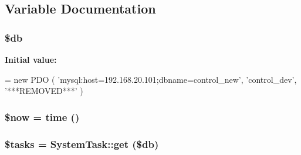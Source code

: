 \subsection{Variable Documentation}
\hypertarget{cron_8php_a1fa3127fc82f96b1436d871ef02be319}{}
\subsubsection[{\$db}]{\setlength{\rightskip}{0pt plus 5cm}\$db}\label{cron_8php_a1fa3127fc82f96b1436d871ef02be319}
{\bfseries Initial value\+:}
\begin{DoxyCode}
= \textcolor{keyword}{new} PDO
(
    \textcolor{stringliteral}{'mysql:host=192.168.20.101;dbname=control\_new'},
    \textcolor{stringliteral}{'control\_dev'},
    \textcolor{stringliteral}{'***REMOVED***'}
)
\end{DoxyCode}
\hypertarget{cron_8php_af1d5ccdee975b8f4d20aaffc5b28557c}{}
\subsubsection[{\$now}]{\setlength{\rightskip}{0pt plus 5cm}\$now = time ()}\label{cron_8php_af1d5ccdee975b8f4d20aaffc5b28557c}
\hypertarget{cron_8php_aebdff6d420d3918695f9e95bc01a4d38}{}
\subsubsection[{\$tasks}]{\setlength{\rightskip}{0pt plus 5cm}\$tasks = {\bf System\+Task\+::get} (\$db)}\label{cron_8php_aebdff6d420d3918695f9e95bc01a4d38}
